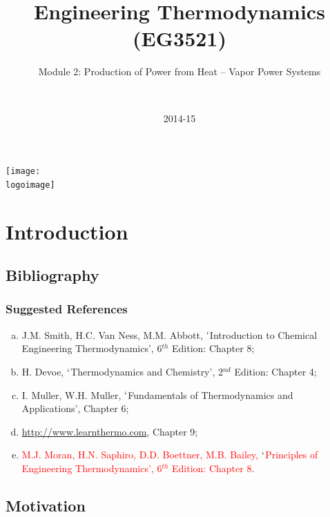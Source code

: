 \documentclass[10pt,compress]{beamer}
\institute{School of Engineering}
\title{Engineering Thermodynamics (EG3521)}
\subtitle{Module 2: Production of Power from Heat -- Vapor Power Systems}
\date[2014-15]{2014-15}
\author[\shortname]{%
  \fullname\\\ttfamily{\emailaddress}
}
\newcommand{\logoimage}{../FigBanner/UoAHorizBanner}
\newcommand{\red}{\textcolor{red}}
\begin{document}
\begin{frame}
  \titlepage
  \vfill%
  \begin{center}
    \texttt{[image: \\logoimage]}
  \end{center}
\end{frame}




\section{Introduction}

\subsection{Bibliography} 
\begin{frame}
 \frametitle{Suggested References}
  \begin{enumerate}[(a)]
   \item J.M. Smith, H.C. Van Ness, M.M. Abbott, $\lq$Introduction to Chemical Engineering Thermodynamics', 6$^{th}$ Edition: Chapter 8;
   \item H. Devoe, $\lq$Thermodynamics and Chemistry', 2$^{nd}$ Edition: Chapter 4;
   \item I. Muller, W.H. Muller, $\lq$Fundamentals of Thermodynamics and Applications', Chapter 6;
   \item \href{http://www.learnthermo.com}{http://www.learnthermo.com}, Chapter 9;
   \item \red{M.J. Moran, H.N. Saphiro, D.D. Boettner, M.B. Bailey, $\lq$Principles of Engineering Thermodynamics', 6$^{th}$ Edition: Chapter 8}.
  \end{enumerate}
\end{frame}


\subsection{Motivation}
\end{document}
